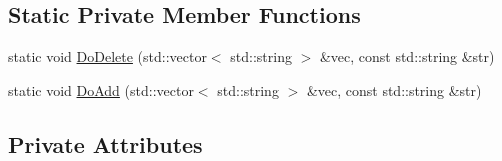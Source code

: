 \subsection*{Static Private Member Functions}
\begin{DoxyCompactItemize}
\item 
static void \hyperlink{classGeneralChannelMessage_a1427cf97f758b92c79262934bab20e28}{Do\-Delete} (std\-::vector$<$ std\-::string $>$ \&vec, const std\-::string \&str)
\item 
static void \hyperlink{classGeneralChannelMessage_a4795285b54ebe85294e2b9ce4ce8440c}{Do\-Add} (std\-::vector$<$ std\-::string $>$ \&vec, const std\-::string \&str)
\end{DoxyCompactItemize}
\subsection*{Private Attributes}
